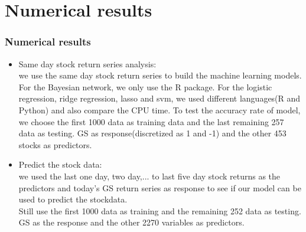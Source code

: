 \documentclass{beamer}
\begin{document}
\section{Numerical results}

\begin{frame}
\frametitle{Numerical results}
\begin{itemize}
        \item  Same day stock return series analysis:\\
        we use the same day stock return series to build the machine learning models. For the Bayesian network, we only use the R package. For the  logistic regression, ridge regression, lasso and svm, we used different languages(R and Python) and also compare the CPU time.
        To test the accuracy rate of model, we choose the first 1000 data as training data and the last remaining 257 data as testing. GS as response(discretized as 1 and -1) and the other 453 stocks as predictors.\\
        \item  Predict the stock data:\\
        we used the last one day, two day,... to last five day stock returns as the predictors and today's GS return series as response to see if our model can be used to predict the stockdata.\\
        Still use the first 1000 data as training and the remaining 252 data as testing. GS as the response and the other 2270 variables as predictors.\\
    \end{itemize}

\end{frame}
\end{document}
